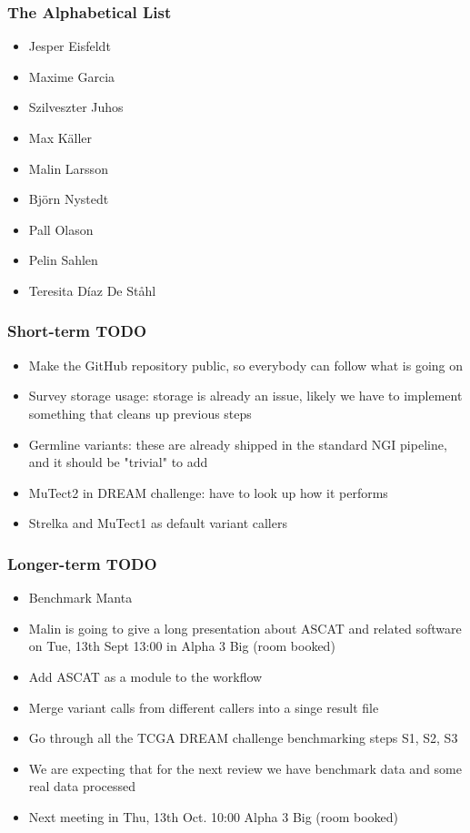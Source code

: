 \documentclass{beamer}
\begin{document}
\begin{frame}
\frametitle{The Alphabetical List}
\begin{itemize}
	\item Jesper Eisfeldt
	\item Maxime Garcia 
	\item Szilveszter Juhos 
	\item Max Käller
	\item Malin Larsson
	\item Björn Nystedt 
	\item Pall Olason
	\item Pelin Sahlen
	\item Teresita Díaz De Ståhl
\end{itemize}
\end{frame}

\begin{frame}
\frametitle{Short-term TODO}
	\begin{itemize}
		\item Make the GitHub repository public, so everybody can follow what is going on
		\item Survey storage usage: storage is already an issue, likely we have to implement something that cleans up previous steps
		\item Germline variants: these are already shipped in the standard NGI pipeline, and it should be "trivial" to add
		\item MuTect2 in DREAM challenge: have to look up how it performs
		\item Strelka and MuTect1 as default variant callers
	\end{itemize} 
\end{frame}


\begin{frame}
\frametitle{Longer-term TODO}
	\begin{itemize}
		\item Benchmark Manta
		\item Malin is going to give a long presentation about ASCAT and related software on Tue, 13th Sept 13:00 in Alpha 3 Big (room booked)
		\item Add ASCAT as a module to the workflow
		\item Merge variant calls from different callers into a singe result file
		\item Go through all the TCGA DREAM challenge benchmarking steps S1, S2, S3
		\item We are expecting that for the next review we have benchmark data and some real data processed
		\item Next meeting in Thu, 13th Oct. 10:00 Alpha 3 Big (room booked)
	\end{itemize}
\end{frame}
\end{document}
